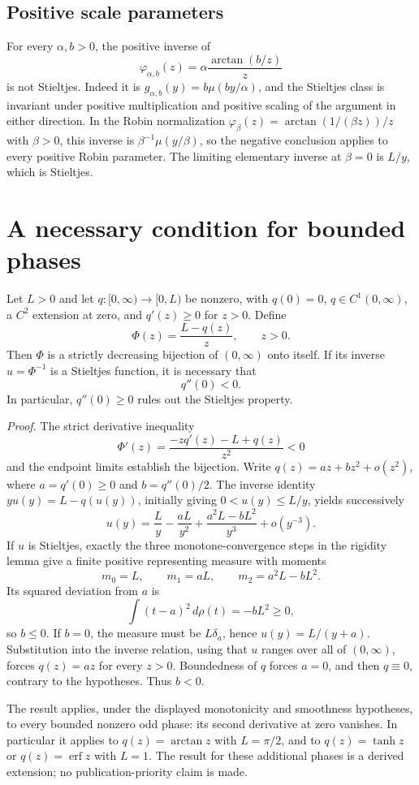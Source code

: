 \documentclass[11pt,a4paper]{article}
\begin{document}
\subsection{Positive scale parameters}
For every $\alpha,b>0$, the positive inverse of
\[
 \varphi_{\alpha,b}(z)=\alpha\frac{\arctan(b/z)}{z}
\]
is not Stieltjes. Indeed it is $g_{\alpha,b}(y)=b\mu(by/\alpha)$,
and the Stieltjes class is invariant under positive multiplication
and positive scaling of the argument in either direction.
In the Robin normalization $\varphi_\beta(z)=\arctan(1/(\beta z))/z$
with $\beta>0$, this inverse is $\beta^{-1}\mu(y/\beta)$, so the
negative conclusion applies to every positive Robin parameter.
The limiting elementary inverse at $\beta=0$ is $L/y$, which is
Stieltjes.

\section{A necessary condition for bounded phases}
Let $L>0$ and let $q:[0,\infty)\to[0,L)$ be nonzero, with
$q(0)=0$, $q\in C^1(0,\infty)$, a $C^2$ extension at zero, and
$q'(z)\ge0$ for $z>0$. Define
\[
 \Phi(z)=\frac{L-q(z)}{z},\qquad z>0.
\]
Then $\Phi$ is a strictly decreasing bijection of $(0,\infty)$
onto itself. If its inverse $u=\Phi^{-1}$ is a Stieltjes function,
it is necessary that
\[
 \boxed{q''(0)<0.}
\]
In particular, $q''(0)\ge0$ rules out the Stieltjes property.

\emph{Proof.} The strict derivative inequality
\[
 \Phi'(z)=\frac{-zq'(z)-L+q(z)}{z^2}<0
\]
and the endpoint limits establish the bijection. Write
$q(z)=az+bz^2+o(z^2)$, where $a=q'(0)\ge0$ and
$b=q''(0)/2$. The inverse identity $yu(y)=L-q(u(y))$, initially
giving $0<u(y)\le L/y$, yields successively
\[
 u(y)=\frac L y-\frac{aL}{y^2}
              +\frac{a^2L-bL^2}{y^3}+o(y^{-3}).
\]
If $u$ is Stieltjes, exactly the three monotone-convergence steps
in the rigidity lemma give a finite positive representing measure
with moments
\[
 m_0=L,\qquad m_1=aL,\qquad m_2=a^2L-bL^2.
\]
Its squared deviation from $a$ is
\[
 \int(t-a)^2\,d\rho(t)=-bL^2\ge0,
\]
so $b\le0$. If $b=0$, the measure must be $L\delta_a$, hence
$u(y)=L/(y+a)$. Substitution into the inverse relation, using that
$u$ ranges over all of $(0,\infty)$, forces $q(z)=az$ for every
$z>0$. Boundedness of $q$ forces $a=0$, and then $q\equiv0$,
contrary to the hypotheses. Thus $b<0$.

The result applies, under the displayed monotonicity and smoothness
hypotheses, to every bounded nonzero odd phase: its second derivative
at zero vanishes. In particular it applies to $q(z)=\arctan z$
with $L=\pi/2$, and to $q(z)=\tanh z$ or $q(z)=\operatorname{erf}z$
with $L=1$. The result for these additional phases is a derived
extension; no publication-priority claim is made.
\end{document}
